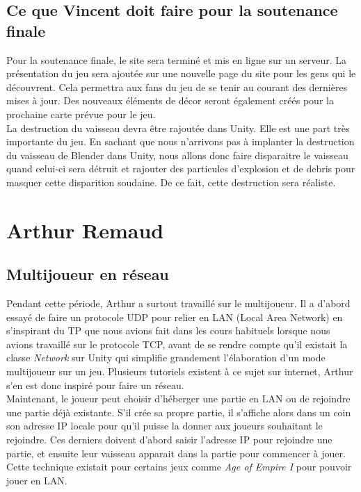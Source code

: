 \documentclass[10pt, titlepage]{report}
\begin{document}
\subsection{Ce que Vincent doit faire pour la soutenance finale}
Pour la soutenance finale, le site sera terminé et mis en ligne sur un serveur. La présentation du jeu sera ajoutée sur une nouvelle page du site pour les gens qui le découvrent. Cela permettra aux fans du jeu de se tenir au courant des dernières mises à jour. Des nouveaux éléments de décor seront également créés pour la prochaine carte prévue pour le jeu.\\

La destruction du vaisseau devra être rajoutée dans Unity. Elle est une part très importante du jeu. En sachant que nous n'arrivons pas à implanter la destruction du vaisseau de Blender dans Unity, nous allons donc faire disparaitre le vaisseau quand celui-ci sera détruit et rajouter des particules d'explosion et de debris pour masquer cette disparition soudaine. De ce fait, cette destruction sera réaliste.\\

\section{Arthur Remaud}

\subsection{Multijoueur en réseau}
Pendant cette période, Arthur a surtout travaillé sur le multijoueur. Il a d'abord essayé de faire un protocole UDP pour relier en LAN (Local Area Network) en s'inspirant du TP que nous avions fait dans les cours habituels lorsque nous avions travaillé sur le protocole TCP, avant de se rendre compte qu'il existait la classe \textit{Network} sur Unity qui simplifie grandement l'élaboration d'un mode multijoueur sur un jeu. Plusieurs tutoriels existent à ce sujet sur internet, Arthur s'en est donc inspiré pour faire un réseau.\\

Maintenant, le joueur peut choisir d'héberger une partie en LAN ou de rejoindre une partie déjà existante. S'il crée sa propre partie, il s'affiche alors dans un coin son adresse IP locale pour qu'il puisse la donner aux joueurs souhaitant le rejoindre. Ces derniers doivent d'abord saisir l'adresse IP pour rejoindre une partie, et ensuite leur vaisseau apparait dans la partie pour commencer à jouer. Cette technique existait pour certains jeux comme \textit{Age of Empire I} pour pouvoir jouer en LAN.\\
\end{document}
